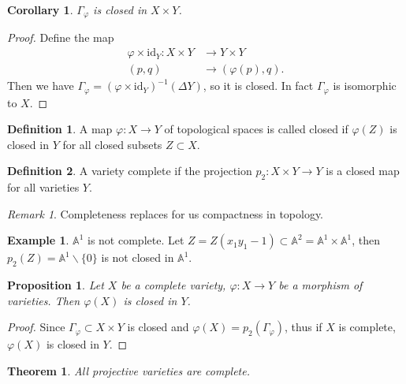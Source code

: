 \documentclass{amsart}
\theoremstyle{plain}
\newtheorem{theorem}{Theorem}
\newtheorem{corollary}{Corollary}
\newtheorem{proposition}{Proposition}
\theoremstyle{definition}
\newtheorem{definition}{Definition}
\newtheorem{example}{Example}
\theoremstyle{remark}
\newtheorem*{remark}{Remark}
\numberwithin{equation}{section}
\begin{document}
 \begin{corollary}
 	$ \Gamma_\varphi $ is closed in $ X\times Y $.
 \end{corollary}
 \begin{proof}
 	Define the map
 	$$\begin{array}{cc}
 	\varphi\times\text{id}_Y : X\times Y & \to Y\times Y\\
 	(p,q) & \to (\varphi(p),q).
 	\end{array}$$
 	Then we have $ \Gamma_\varphi = (\varphi\times\text{id}_Y)^{-1}(\Delta Y) $, so it is closed. In fact $ \Gamma_\varphi $ is isomorphic to $ X $.
 \end{proof}
 \begin{definition}
 	A map $ \varphi:X\to Y $ of topological spaces is called closed if $ \varphi(Z) $ is closed in $ Y $ for all closed subsets $ Z\subset X $.
 \end{definition}
 \begin{definition}
 	A variety complete if the projection $ p_2:X\times Y\to Y $ is a closed map for all varieties $ Y $.
 \end{definition}
 \begin{remark}
 	Completeness replaces for us compactness in topology.
 \end{remark}
 \begin{example}
 	$ \mathbb{A}^1 $ is not complete. Let $ Z=Z(x_1y_1-1)\subset \mathbb{A}^2=\mathbb{A}^1\times \mathbb{A}^1 $, then $ p_2(Z)=\mathbb{A}^1\backslash\{ 0 \} $ is not closed in $ \mathbb{A}^1 $.
 \end{example}
 \begin{proposition}
 	Let $ X $ be a complete variety, $ \varphi:X\to Y $ be a morphism of varieties. Then $ \varphi(X) $ is closed in $ Y $.
 \end{proposition}
 \begin{proof}
 	Since $ \Gamma_\varphi\subset X\times Y $ is closed and $ \varphi(X)=p_2(\Gamma_\varphi) $, thus if $ X $ is complete, $ \varphi(X) $ is closed in $ Y $.
 \end{proof}
 \begin{theorem}
 	All projective varieties are complete.
 \end{theorem}
\end{document}
